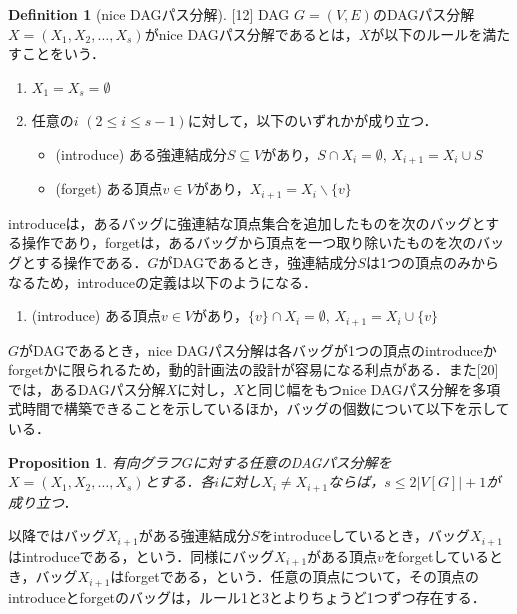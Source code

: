\documentclass[master]{kuisthesis}		%
\theoremstyle{plain}
\newtheorem{proposition}{Proposition}
\theoremstyle{definition}
\newtheorem{definition*}{Definition}
\begin{document}
\begin{definition*}[nice DAGパス分解][12]
    DAG $G=(V, E)$のDAGパス分解$X=(X_1, X_2,  \dots, X_s)$がnice DAGパス分解であるとは，$X$が以下のルールを満たすことをいう．

    \begin{enumerate}
        \item $X_1 = X_s = \emptyset$
        \item 任意の$i$ $(2 \leq i \leq s-1)$に対して，以下のいずれかが成り立つ．
        \begin{itemize}
            \item (introduce) ある強連結成分$S \subseteq V$があり，$S \cap X_i = \emptyset$, $X_{i+1} = X_i \cup S$
            \item (forget) ある頂点$v \in V$があり，$X_{i+1} = X_i \backslash \{v\}$
        \end{itemize}
    \end{enumerate}

\end{definition*}

introduceは，あるバッグに強連結な頂点集合を追加したものを次のバッグとする操作であり，forgetは，あるバッグから頂点を一つ取り除いたものを次のバッグとする操作である．$G$がDAGであるとき，強連結成分$S$は1つの頂点のみからなるため，introduceの定義は以下のようになる．

\begin{enumerate}
    \item (introduce) ある頂点$v \in V$があり，$\{v\} \cap X_i = \emptyset$, $X_{i+1} = X_i \cup \{v\}$
\end{enumerate}

$G$がDAGであるとき，nice DAGパス分解は各バッグが1つの頂点のintroduceかforgetかに限られるため，動的計画法の設計が容易になる利点がある．また[20]では，あるDAGパス分解$X$に対し，$X$と同じ幅をもつnice DAGパス分解を多項式時間で構築できることを示しているほか，バッグの個数について以下を示している．

\begin{proposition}\label{number_of_bag}
    有向グラフ$G$に対する任意のDAGパス分解を$X=(X_1, X_2, \dots, X_s)$とする．各$i$に対し$X_i \neq X_{i+1}$ならば，$s \leq 2|V[G]|+1$が成り立つ．
\end{proposition}


以降ではバッグ$X_{i+1}$がある強連結成分$S$をintroduceしているとき，バッグ$X_{i+1}$はintroduceである，という．同様にバッグ$X_{i+1}$がある頂点$v$をforgetしているとき，バッグ$X_{i+1}$はforgetである，という．任意の頂点について，その頂点のintroduceとforgetのバッグは，ルール1と3とよりちょうど1つずつ存在する．
\end{document}

